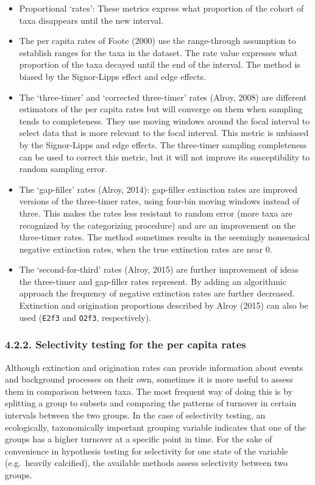 \documentclass[]{article}
\begin{document}
\begin{itemize}
\item
  Proportional `rates': These metrics express what proportion of the
  cohort of taxa disappears until the new interval.
\item
  The per capita rates of Foote (2000) use the range-through assumption
  to establish ranges for the taxa in the dataset. The rate value
  expresses what proportion of the taxa decayed until the end of the
  interval. The method is biased by the Signor-Lipps effect and edge
  effects.
\item
  The `three-timer' and `corrected three-timer' rates (Alroy, 2008) are
  different estimators of the per capita rates but will converge on them
  when sampling tends to completeness. They use moving windows around
  the focal interval to select data that is more relevant to the focal
  interval. This metric is unbiased by the Signor-Lipps and edge
  effects. The three-timer sampling completeness can be used to correct
  this metric, but it will not improve its susceptibility to random
  sampling error.
\item
  The `gap-filler' rates (Alroy, 2014): gap-filler extinction rates are
  improved versions of the three-timer rates, using four-bin moving
  windows instead of three. This makes the rates less resistant to
  random error (more taxa are recognized by the categorizing procedure)
  and are an improvement on the three-timer rates. The method sometimes
  results in the seemingly nonsensical negative extinction rates, when
  the true extinction rates are near 0.
\item
  The `second-for-third' rates (Alroy, 2015) are further improvement of
  ideas the three-timer and gap-filler rates represent. By adding an
  algorithmic approach the frequency of negative extinction rates are
  further decreased. Extinction and origination proportions described by
  Alroy (2015) can also be used (\texttt{E2f3} and \texttt{O2f3},
  respectively).
\end{itemize}

\hypertarget{selectivity-testing-for-the-per-capita-rates}{%
\subsubsection{4.2.2. Selectivity testing for the per capita
rates}\label{selectivity-testing-for-the-per-capita-rates}}

Although extinction and origination rates can provide information about
events and background processes on their own, sometimes it is more
useful to assess them in comparison between taxa. The most frequent way
of doing this is by splitting a group to subsets and comparing the
patterns of turnover in certain intervals between the two groups. In the
case of selectivity testing, an ecologically, taxonomically important
grouping variable indicates that one of the groups has a higher turnover
at a specific point in time. For the sake of convenience in hypothesis
testing for selectivity for one state of the variable (e.g.~heavily
calcified), the available methods assess selectivity between two groups.
\end{document}
